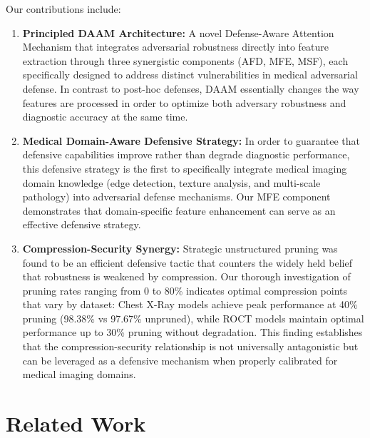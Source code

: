 \documentclass[preprint,12pt]{elsarticle}
\begin{document}
Our contributions include:
\begin{enumerate}
    \item \textbf{Principled DAAM Architecture:} A novel Defense-Aware Attention Mechanism that integrates adversarial robustness directly into feature extraction through three synergistic components (AFD, MFE, MSF), each specifically designed to address distinct vulnerabilities in medical adversarial defense. In contrast to post-hoc defenses, DAAM essentially changes the way features are processed in order to optimize both adversary robustness and diagnostic accuracy at the same time.
    
    \item \textbf{Medical Domain-Aware Defensive Strategy:} In order to guarantee that defensive capabilities improve rather than degrade diagnostic performance, this defensive strategy is the first to specifically integrate medical imaging domain knowledge (edge detection, texture analysis, and multi-scale pathology) into adversarial defense mechanisms. Our MFE component demonstrates that domain-specific feature enhancement can serve as an effective defensive strategy.
    
    \item \textbf{Compression-Security Synergy:} Strategic unstructured pruning was found to be an efficient defensive tactic that counters the widely held belief that robustness is weakened by compression. Our thorough investigation of pruning rates ranging from 0 to 80\% indicates optimal compression points that vary by dataset: Chest X-Ray models achieve peak performance at 40\% pruning (98.38\% vs 97.67\% unpruned), while ROCT models maintain optimal performance up to 30\% pruning without degradation. This finding establishes that the compression-security relationship is not universally antagonistic but can be leveraged as a defensive mechanism when properly calibrated for medical imaging domains.
\end{enumerate}

\section{Related Work}
\label{sec:related_work}
\end{document}
